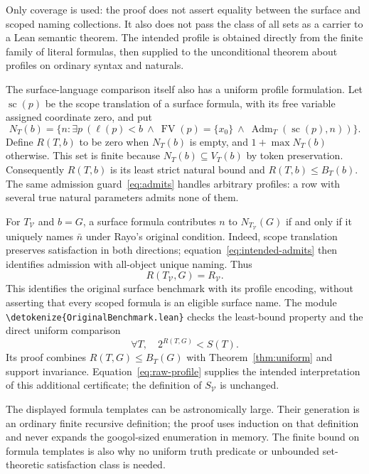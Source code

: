 \documentclass[11pt]{article}
\newcommand{\V}{\mathcal V}
\newcommand{\Adm}{\operatorname{Adm}}
\newcommand{\code}[1]{{\small\expandafter\nolinkurl\expandafter{\detokenize{#1}}}}
\begin{document}
Only coverage is used: the proof does not assert equality between the surface
and scoped naming collections. It also does not pass the class of all sets
as a carrier to a Lean semantic theorem. The intended profile is obtained
directly from the finite family of literal formulas, then supplied to the
unconditional theorem about profiles on ordinary syntax and naturals.

The surface-language comparison itself also has a uniform profile
formulation. Let $\operatorname{sc}(p)$ be the scope translation of a surface
formula, with its free variable assigned coordinate zero, and put
\[
 N_T(b)=\{n:\exists p\ (\ell(p)<b\ \wedge\
       \operatorname{FV}(p)=\{x_0\}\ \wedge\
       \Adm_T(\operatorname{sc}(p),n))\}.
\]
Define $R(T,b)$ to be zero when $N_T(b)$ is empty, and
$1+\max N_T(b)$ otherwise. This set is finite because
$N_T(b)\subseteq V_T(b)$ by token preservation. Consequently $R(T,b)$ is
its least strict natural bound and $R(T,b)\leq B_T(b)$. The same admission
guard~\eqref{eq:admits} handles arbitrary profiles: a row with several true
natural parameters admits none of them.

For $T_{\V}$ and $b=G$, a surface formula contributes $n$ to $N_{T_{\V}}(G)$
if and only if it uniquely names $\bar n$ under Rayo's original condition.
Indeed, scope translation preserves satisfaction in both directions;
equation~\eqref{eq:intended-admits} then identifies admission with all-object
unique naming. Thus
\begin{equation}\label{eq:raw-profile}
                    R(T_{\V},G)=R_{\V}.
\end{equation}
This identifies the original surface benchmark with its profile encoding,
without asserting that every scoped formula is an eligible surface name.
The module \code{OriginalBenchmark.lean} checks the least-bound property and
the direct uniform comparison
\[
                         \forall T,\quad 2^{R(T,G)}<S(T).
\]
Its proof combines $R(T,G)\leq B_T(G)$ with Theorem~\ref{thm:uniform} and
support invariance. Equation~\eqref{eq:raw-profile} supplies the intended
interpretation of this additional certificate; the definition of $S_{\V}$
is unchanged.

The displayed formula templates can be astronomically large. Their generation
is an ordinary finite recursive definition; the proof uses induction on that
definition and never expands the googol-sized enumeration in memory. The
finite bound on formula templates is also why no uniform truth predicate or
unbounded set-theoretic satisfaction class is needed.
\end{document}
